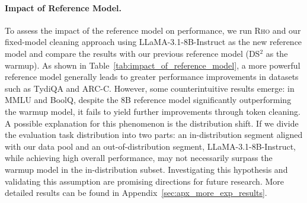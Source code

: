 \begin{table}[t]
    \centering
    \caption{Performance comparison with a new reference model: LLaMA-3.1-8B-Instruct. 
    {\color{blue}Blue}: A better reference model brings a higher performance improvement. {\color{red}Red}: The counterpart.}
    \vspace{0.5ex}

    \label{tab:impact_of_reference_model}
\end{table}

\paragraph{Impact of Reference Model.}
To assess the impact of the reference model on performance, we run \textsc{Rho} and our fixed-model cleaning approach using LLaMA-3.1-8B-Instruct as the new reference model and compare the results with our previous reference model (DS$^2$ as the warmup). As shown in Table~\ref{tab:impact_of_reference_model}, a more powerful reference model generally leads to greater performance improvements in datasets such as TydiQA and ARC-C. However, some counterintuitive results emerge: in MMLU and BoolQ, despite the 8B reference model significantly outperforming the warmup model, it fails to yield further improvements through token cleaning.
A possible explanation for this phenomenon is the distribution shift. If we divide the evaluation task distribution into two parts: an in-distribution segment aligned with our data pool and an out-of-distribution segment, LLaMA-3.1-8B-Instruct, while achieving high overall performance, may not necessarily surpass the warmup model in the in-distribution subset. Investigating this hypothesis and validating this assumption are promising directions for future research.
More detailed results can be found in Appendix~\ref{sec:apx_more_exp_results}.








